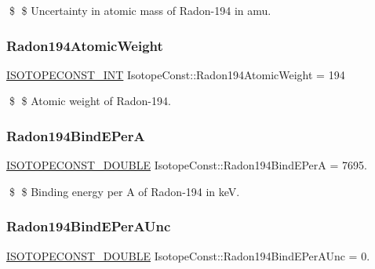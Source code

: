 \$ \$ Uncertainty in atomic mass of Radon-\/194 in amu. \mbox{\label{group___isotope_const-_radon-_rn194_ga9a3348941bd6fb588e031504a801d8d6}} 
\subsubsection{\texorpdfstring{Radon194\+Atomic\+Weight}{Radon194AtomicWeight}}
{\footnotesize\ttfamily \mbox{\hyperlink{group___isotope_const-_macros_ga5f18360b3e99483a35c32d789e62621c}{I\+S\+O\+T\+O\+P\+E\+C\+O\+N\+S\+T\+\_\+\+I\+NT}} Isotope\+Const\+::\+Radon194\+Atomic\+Weight = 194}

\$ \$ Atomic weight of Radon-\/194. \mbox{\label{group___isotope_const-_radon-_rn194_gaf7e800a87b1af2e7129d5d9dff4f5dc4}} 
\subsubsection{\texorpdfstring{Radon194\+Bind\+E\+PerA}{Radon194BindEPerA}}
{\footnotesize\ttfamily \mbox{\hyperlink{group___isotope_const-_macros_ga8f45a7272ce02c0b4c65c44636ed719a}{I\+S\+O\+T\+O\+P\+E\+C\+O\+N\+S\+T\+\_\+\+D\+O\+U\+B\+LE}} Isotope\+Const\+::\+Radon194\+Bind\+E\+PerA = 7695.}

\$ \$ Binding energy per A of Radon-\/194 in keV. \mbox{\label{group___isotope_const-_radon-_rn194_gac99dc3177ac58f88593ea65d28032aef}} 
\subsubsection{\texorpdfstring{Radon194\+Bind\+E\+Per\+A\+Unc}{Radon194BindEPerAUnc}}
{\footnotesize\ttfamily \mbox{\hyperlink{group___isotope_const-_macros_ga8f45a7272ce02c0b4c65c44636ed719a}{I\+S\+O\+T\+O\+P\+E\+C\+O\+N\+S\+T\+\_\+\+D\+O\+U\+B\+LE}} Isotope\+Const\+::\+Radon194\+Bind\+E\+Per\+A\+Unc = 0.}

